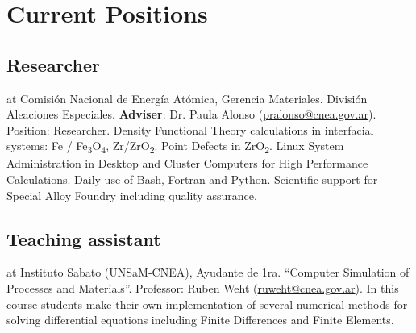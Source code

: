 \section{Current Positions}

\subsection{ Researcher} at Comisión Nacional de Energía Atómica,  Gerencia Materiales. División Aleaciones Especiales. \textbf{Adviser}: Dr. Paula Alonso (\url{pralonso@cnea.gov.ar}). Position: Researcher. Density Functional Theory calculations in interfacial systems: Fe / Fe\textsubscript{3}O\textsubscript{4}, Zr/ZrO\textsubscript{2}. Point Defects in ZrO\textsubscript{2}. Linux System Administration in Desktop and Cluster Computers for High Performance Calculations. Daily use of Bash, Fortran and Python. Scientific support for Special Alloy Foundry including quality assurance.

\subsection{Teaching assistant} at Instituto Sabato (UNSaM-CNEA), Ayudante de 1ra. “Computer Simulation of Processes and Materials”. Professor: Ruben Weht (\url{ruweht@cnea.gov.ar}). In this course students make their own implementation of several numerical methods for solving differential equations including Finite Differences and Finite Elements.
